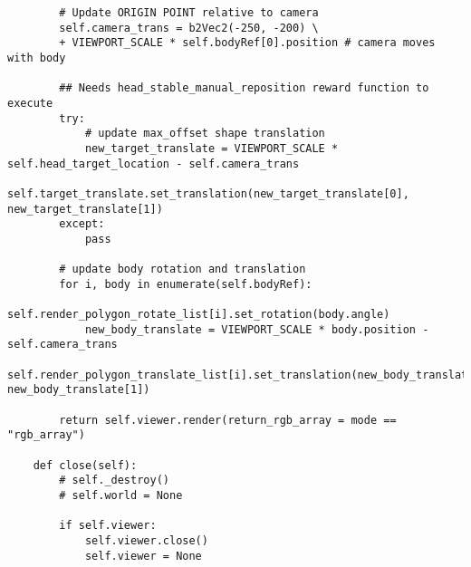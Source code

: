 \begin{lstlisting}
        # Update ORIGIN POINT relative to camera
        self.camera_trans = b2Vec2(-250, -200) \
        + VIEWPORT_SCALE * self.bodyRef[0].position # camera moves with body

        ## Needs head_stable_manual_reposition reward function to execute
        try:
            # update max_offset shape translation
            new_target_translate = VIEWPORT_SCALE * self.head_target_location - self.camera_trans
            self.target_translate.set_translation(new_target_translate[0], new_target_translate[1])
        except:
            pass

        # update body rotation and translation
        for i, body in enumerate(self.bodyRef):
            self.render_polygon_rotate_list[i].set_rotation(body.angle)
            new_body_translate = VIEWPORT_SCALE * body.position - self.camera_trans
            self.render_polygon_translate_list[i].set_translation(new_body_translate[0], new_body_translate[1])

        return self.viewer.render(return_rgb_array = mode == "rgb_array")

    def close(self):
        # self._destroy()
        # self.world = None

        if self.viewer:
            self.viewer.close()
            self.viewer = None
\end{lstlisting}
